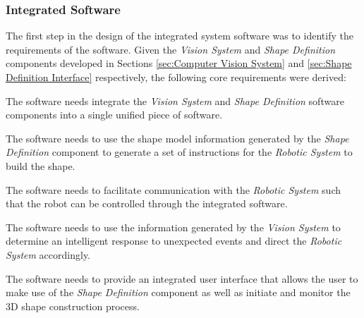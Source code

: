 \subsubsection{Integrated Software} \label{sec:Integrated Software}

The first step in the design of the integrated system software was to identify the requirements of the software. Given the \textit{Vision System} and \textit{Shape Definition} components developed in Sections \ref{sec:Computer Vision System} and \ref{sec:Shape Definition Interface}
respectively, the following core requirements were derived:

\begin{compactitem}
	\item The software needs integrate the \textit{Vision System} and \textit{Shape Definition} software components into a single unified piece of software.
	\item The software needs to use the shape model information generated by the \textit{Shape Definition} component to generate a set of instructions for the \textit{Robotic System} to build the shape.
	\item The software needs to facilitate communication with the \textit{Robotic System} such that the robot can be controlled through the integrated software.
	\item The software needs to use the information generated by the \textit{Vision System} to determine an intelligent response to unexpected events and direct the \textit{Robotic System} accordingly.
	\item The software needs to provide an integrated user interface that allows the user to make use of the \textit{Shape Definition} component as well as initiate and monitor the 3D shape construction process.
\end{compactitem}

